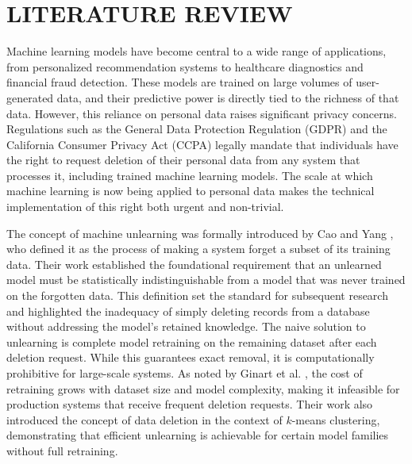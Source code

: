 \chapter{LITERATURE REVIEW}

Machine learning models have become central to a wide range of applications, from personalized recommendation systems to healthcare diagnostics and financial fraud detection. These models are trained on large volumes of user-generated data, and their predictive power is directly tied to the richness of that data. However, this reliance on personal data raises significant privacy concerns. Regulations such as the General Data Protection Regulation (GDPR) \cite{gdpr2016} and the California Consumer Privacy Act (CCPA) legally mandate that individuals have the right to request deletion of their personal data from any system that processes it, including trained machine learning models. The scale at which machine learning is now being applied to personal data makes the technical implementation of this right both urgent and non-trivial.

The concept of machine unlearning was formally introduced by Cao and Yang \cite{cao2015towards}, who defined it as the process of making a system forget a subset of its training data. Their work established the foundational requirement that an unlearned model must be statistically indistinguishable from a model that was never trained on the forgotten data. This definition set the standard for subsequent research and highlighted the inadequacy of simply deleting records from a database without addressing the model's retained knowledge. The naive solution to unlearning is complete model retraining on the remaining dataset after each deletion request. While this guarantees exact removal, it is computationally prohibitive for large-scale systems. As noted by Ginart et al. \cite{ginart2019making}, the cost of retraining grows with dataset size and model complexity, making it infeasible for production systems that receive frequent deletion requests. Their work also introduced the concept of data deletion in the context of $k$-means clustering, demonstrating that efficient unlearning is achievable for certain model families without full retraining.

